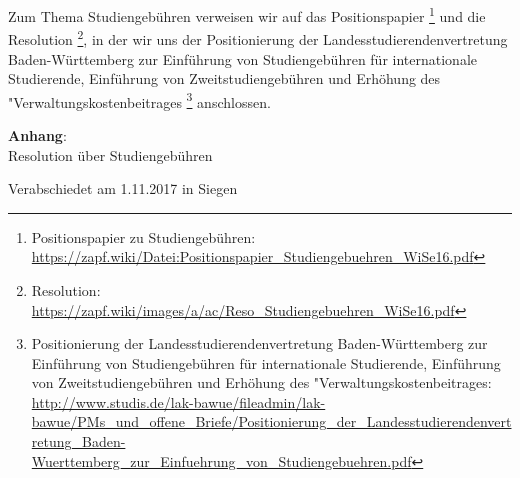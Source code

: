 \documentclass[DIV=calc]{scrartcl}
\begin{document}
Zum Thema Studiengebühren verweisen wir auf das Positionspapier \footnote{Positionspapier zu Studiengebühren:
	\\\url{https://zapf.wiki/Datei:Positionspapier_Studiengebuehren_WiSe16.pdf}} und  die Resolution \footnote{Resolution:\\
	\url{https://zapf.wiki/images/a/ac/Reso_Studiengebuehren_WiSe16.pdf}}, in der wir uns der Positionierung der Landesstudierendenvertretung Baden-Württemberg zur Einführung von Studiengebühren für internationale Studierende, Einführung von Zweitstudiengebühren und Erhöhung des "Verwaltungskostenbeitrages
\grqq \footnote{Positionierung der Landesstudierendenvertretung Baden-Württemberg zur Einführung von Studiengebühren für internationale Studierende, Einführung von Zweitstudiengebühren und Erhöhung des "Verwaltungskostenbeitrages\grqq:\\
	\url{http://www.studis.de/lak-bawue/fileadmin/lak-bawue/PMs_und_offene_Briefe/Positionierung_der_Landesstudierendenvertretung_Baden-Wuerttemberg_zur_Einfuehrung_von_Studiengebuehren.pdf}
} anschlossen. 

\sloppy

\textbf{Anhang}: 
\\Resolution über Studiengebühren
\vspace{-0.5\baselineskip}
    \begin{flushright}
        Verabschiedet am 1.11.2017 in Siegen
    \end{flushright}
\end{document}
